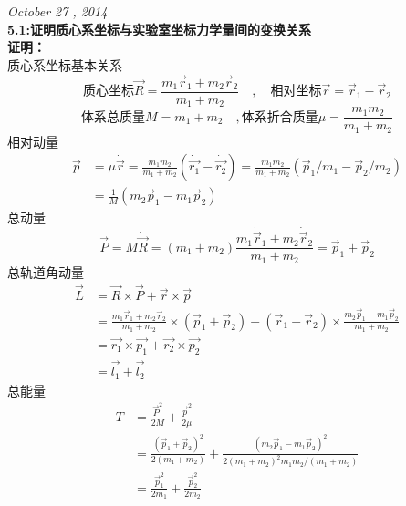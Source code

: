 \documentclass[a4paper]{article}
\newcommand{\VEC}[1]{\overrightarrow{#1}}
\begin{document}
\begin{CJK*}{UTF8}{song}
    \noindent\Large{\emph{October 27 , 2014}}\\[15pt]
    \noindent \textbf{5.1:证明质心系坐标与实验室坐标力学量间的变换关系}\\[8pt]
    {
    \noindent\textbf{证明：}\\[5pt]
    质心系坐标基本关系
    $$\mbox{质心坐标}\vec{R}
        =\frac{m_{1}\vec{r}_{1}+m_{2}\vec{r}_{2}}{m_{1}+m_{2}}\quad,
        \quad\mbox{相对坐标}\vec{r}=\vec{r}_{1}-\vec{r}_{2}$$
    $$\mbox{体系总质量}M=m_{1}+m_{2}\quad,
        \mbox{体系折合质量}\mu=\frac{m_{1}m_{2}}{m_{1}+m_{2}}$$
    相对动量
    \begin{equation*}\begin{split}
    \vec{p} & = \mu\dot{\vec{r}}=\frac{m_{1}m_{2}}{m_{1}+m_{2}}
        (\dot{\vec{r_{1}}}-\dot{\vec{r_{2}}})
        =\frac{m_{1}m_{2}}{m_{1}+m_{2}}(\vec{p}_{1}/m_{1}-\vec{p}_{2}/m_{2})\\
        & =\frac{1}{M}(m_{2}\vec{p}_{1}-m_{1}\vec{p}_{2})
    \end{split}\end{equation*}
    总动量
    $$\vec{P}=M\dot{\vec{R}}=(m_{1}+m_{2})
        \frac{m_{1}\dot{\vec{r}}_{1}+m_{2}\dot{\vec{r}}_{2}}{m_{1}+m_{2}}
        =\vec{p}_{1}+\vec{p}_{2}$$
    总轨道角动量
    \begin{equation*}\begin{split}
    \vec{L} 
        & = \vec{R}\times\vec{P}+\vec{r}\times\vec{p}\\
        & = \frac{m_{1}\vec{r}_{1}+m_{2}\vec{r}_{2}}{m_{1}+m_{2}}
            \times(\vec{p}_{1}+\vec{p}_{2})+(\vec{r}_{1}-\vec{r}_{2})
            \times\frac{m_{2}\vec{p}_{1}-m_{1}\vec{p}_{2}}{m_{1}+m_{2}}\\
        & = \vec{r_{1}}\times\vec{p_{1}}+\vec{r_{2}}\times\vec{p_{2}}\\
        & = \VEC{l_{1}}+\VEC{l_{2}}    
    \end{split}\end{equation*}
    总能量
    \begin{equation*}\begin{split}
    T   & = \frac{\vec{P}^{2}}{2M}+\frac{\vec{p}^{2}}{2\mu}\\
        & = \frac{(\vec{p}_{1}+\vec{p}_{2})^{2}}{2(m_{1}+m_{2})}
            +\frac{(m_{2}\vec{p}_{1}-m_{1}\vec{p}_{2})^{2}}               {2(m_{1}+m_{2})^{2}m_{1}m_{2}/(m_{1}+m_{2})}\\
        & =\frac{\vec{p}_{1}^{2}}{2 m_{1}}+\frac{\vec{p}_{2}^{2}}{2 m_{2}}
    \end{split}\end{equation*}
}
\end{CJK*}
\end{document}
